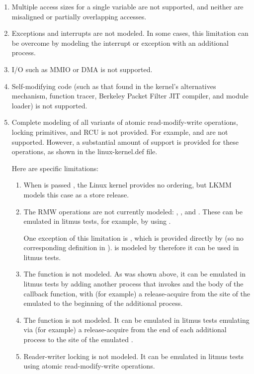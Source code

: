 \begin{enumerate}
  \item	Multiple access sizes for a single variable are not supported,
	and neither are misaligned or partially overlapping accesses.

  \item	Exceptions and interrupts are not modeled.
	In some cases, this limitation can be overcome by modeling the
	interrupt or exception with an additional process.

  \item	I/O such as MMIO or DMA is not supported.

  \item	Self-modifying code (such as that found in the kernel's
	alternatives mechanism, function tracer, Berkeley Packet Filter
	JIT compiler, and module loader) is not supported.

  \item	Complete modeling of all variants of atomic read-modify-write
	operations, locking primitives, and RCU is not provided.
	For example,  and  are not supported.
	However, a substantial amount of support is provided for these
	operations, as shown in the linux-kernel.def file.

	Here are specific limitations:

	\begin{enumerate}
	\item	When  is passed , the Linux
		kernel provides no ordering, but LKMM models this
		case as a store release.

	\item	The  RMW operations are not currently modeled:
		, ,
		and .
		These can be emulated in litmus tests, for example, by
		using .

		One exception of this limitation is ,
		which is provided directly by  (so no corresponding
		definition in ).
		 is modeled by  therefore
		it can be used in litmus tests.

	\item	The  function is not modeled.
		As was shown above, it can be emulated in litmus tests by
		adding another process that invokes 
		and the body of the callback function, with (for example)
		a release-acquire from the site of the emulated 
		to the beginning of the additional process.

	\item	The  function is not modeled.
		It can be emulated in litmus tests emulating  via
		(for example) a release-acquire from the end of each
		additional  process to the site of the
		emulated .

	\item	Reader-writer locking is not modeled.
		It can be emulated in litmus tests using atomic
		read-modify-write operations.
	\end{enumerate}
\end{enumerate}

